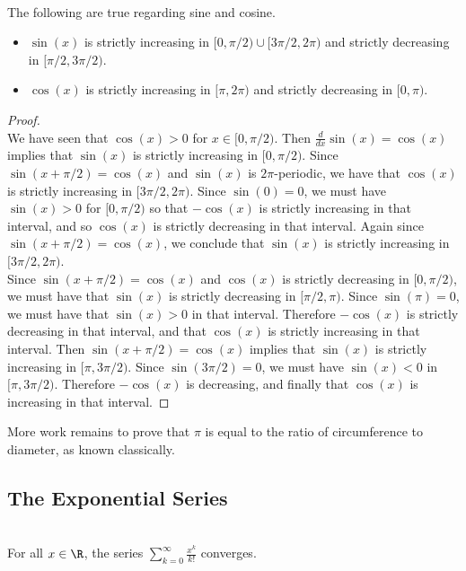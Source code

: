 \documentclass[a4paper]{article}
\begin{document}
\begin{crl}{}{}\\
The following are true regarding sine and cosine. 
\begin{itemize}
\item $\sin(x)$ is strictly increasing in $[0,\pi/2)\cup[3\pi/2,2\pi)$ and strictly decreasing in $[\pi/2,3\pi/2)$. 
\item $\cos(x)$ is strictly increasing in $[\pi,2\pi)$ and strictly decreasing in $[0,\pi)$. 
\end{itemize}
\begin{proof}\\
We have seen that $\cos(x)>0$ for $x\in[0,\pi/2)$. Then $\frac{d}{dx}\sin(x)=\cos(x)$ implies that $\sin(x)$ is strictly increasing in $[0,\pi/2)$. Since $\sin(x+\pi/2)=\cos(x)$ and $\sin(x)$ is $2\pi$-periodic, we have that $\cos(x)$ is strictly increasing in $[3\pi/2,2\pi)$. Since $\sin(0)=0$, we must have $\sin(x)>0$ for $[0,\pi/2)$ so that $-\cos(x)$ is strictly increasing in that interval, and so $\cos(x)$ is strictly decreasing in that interval. Again since $\sin(x+\pi/2)=\cos(x)$, we conclude that $\sin(x)$ is strictly increasing in $[3\pi/2,2\pi)$. \\

Since $\sin(x+\pi/2)=\cos(x)$ and $\cos(x)$ is strictly decreasing in $[0,\pi/2)$, we must have that $\sin(x)$ is strictly decreasing in $[\pi/2,\pi)$. Since $\sin(\pi)=0$, we must have that $\sin(x)>0$ in that interval. Therefore $-\cos(x)$ is strictly decreasing in that interval, and that $\cos(x)$ is strictly increasing in that interval. Then $\sin(x+\pi/2)=\cos(x)$ implies that $\sin(x)$ is strictly increasing in $[\pi,3\pi/2)$. Since $\sin(3\pi/2)=0$, we must have $\sin(x)<0$ in $[\pi,3\pi/2)$. Therefore $-\cos(x)$ is decreasing, and finally that $\cos(x)$ is increasing in that interval. 
\end{proof}
\end{crl}

More work remains to prove that $\pi$ is equal to the ratio of circumference to diameter, as known classically. 

\subsection{The Exponential Series}
\begin{lmm}{}{}\\
For all $x\in\R$, the series $\sum_{k=0}^\infty\frac{x^k}{k!}$ converges. 
\end{lmm}
\end{document}
